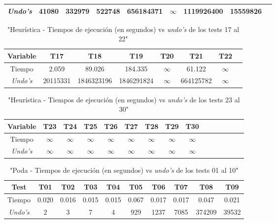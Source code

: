 \documentclass[12pt]{article}
\begin{document}
\begin{center}
\begin{table}[h]
\begin{tabular} {| c | c | c | c | c | c | c | c | c |}
            \textit{Undo's} & 41080 & 332979 & 522748 & 656184371 & $\infty$ & 1119926400 & 15559826 \\
            \hline
        \end{tabular}
    \end{table}
    \begin{table}[h]
        \caption{"Heurística - Tiempos de ejecución (en segundos) vs \textit{undo's} de los tests 17 al 22"}
        \centering
        \begin{tabular} {| c | c | c | c | c | c | c | c |}
            \hline
            Variable & T17 & T18 & T19 & T20 & T21 & T22 \\
            \hline
            Tiempo & 2.059 & 89.026 & 184.335 & $\infty$ & 61.122 & $\infty$ \\
            \textit{Undo's} & 20115331 & 1846323196 & 1846291824 & $\infty$ & 664125782 & $\infty$ \\
            \hline
        \end{tabular}
    \end{table}
    \begin{table}[h]
        \caption{"Heurística - Tiempos de ejecución (en segundos) vs \textit{undo's} de los tests 23 al 30"}
        \centering
        \begin{tabular} {| c | c | c | c | c | c | c | c | c | c | c | c | c | c | c |}
            \hline
            Variable & T23 & T24 & T25 & T26 & T27 & T28 & T29 & T30 \\
            \hline
            Tiempo & $\infty$ & $\infty$ & $\infty$ & $\infty$ & $\infty$ & $\infty$ & $\infty$ & $\infty$ \\
            \textit{Undo's} & $\infty$ & $\infty$ & $\infty$ & $\infty$ & $\infty$ & $\infty$ & $\infty$ & $\infty$ \\
            \hline
        \end{tabular}
    \end{table}
    \begin{table}[h]
        \caption{"Poda - Tiempos de ejecución (en segundos) vs \textit{undo's} de los tests 01 al 10"}
        \centering
        \begin{tabular} {| c | c | c | c | c | c | c | c | c | c |}
            \hline
            Test & T01 & T02 & T03 & T04 & T05 & T06 & T07 & T08 & T09 \\
            \hline
            Tiempo & 0.020 & 0.016 & 0.015 & 0.015 & 0.067 & 0.017 & 0.017 & 0.047 & 0.021 \\
            \textit{Undo's} & 2 & 3 & 7 & 4 & 929 & 1237 & 7085 & 374209 & 39532 \\

\end{tabular}
\end{table}
\end{center}
\end{document}

